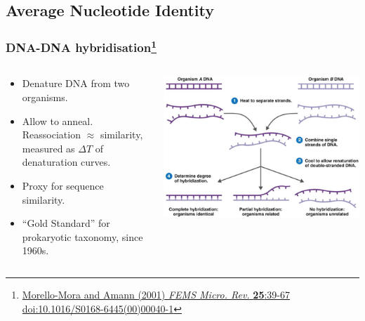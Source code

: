 \subsection{Average Nucleotide Identity}

\begin{frame}
  \frametitle{DNA-DNA hybridisation\footnote{\tiny{\href{http://dx.doi.org/10.1016/S0168-6445(00)00040-1}{Morello-Mora and Amann (2001) \textit{FEMS Micro. Rev.} \textbf{25}:39-67 doi:10.1016/S0168-6445(00)00040-1}}}}
  \begin{columns}[T]
    \begin{column}{5cm}
      \begin{itemize}
        \item Denature DNA from two organisms.
        \item Allow to anneal. Reassociation $\approx$ similarity, measured as $\Delta T$  of denaturation curves.
        \item Proxy for sequence similarity.
        \item ``Gold Standard'' for prokaryotic taxonomy, since 1960s.
      \end{itemize}
    \end{column}
    \begin{column}{5cm}
      \includegraphics[width=1\textwidth]{images/ddh}
    \end{column}
  \end{columns}
\end{frame}

